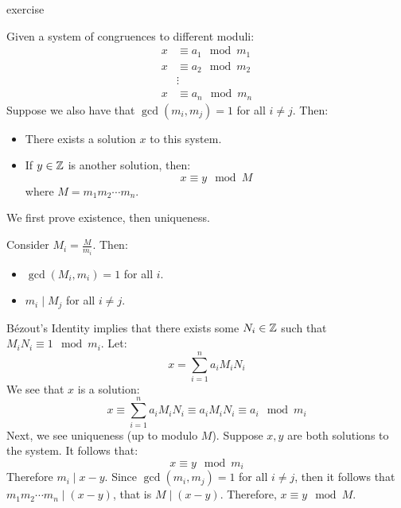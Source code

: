 \documentclass{article}
\begin{document}
\begin{pf}
    exercise
\end{pf}

\newpage
{}

\begin{thm}[title=Chinese Remainder Theorem]
    Given a system of congruences to different moduli:
    \begin{align*}
        x & \equiv a_{1} \mod m_{1} \\
        x & \equiv a_{2} \mod m_{2} \\
          & \vdots \\
        x & \equiv a_{n} \mod m_{n}
    \end{align*}
    Suppose we also have that $ \gcd(m_{i}, m_{j}) = 1 $ for all $ i \neq j $. Then:
    \begin{itemize}
        \item There exists a solution $ x $ to this system.
        \item If $ y \in \mathbb{Z} $ is another solution, then:
            \begin{equation*}
                x \equiv y \mod M
            \end{equation*}
            where $ M = m_{1}m_{2}\cdots m_{n} $.
    \end{itemize}
\end{thm}

\begin{pf}[source=Primary Source Material]
    We first prove existence, then uniqueness. \npgh

    Consider $ M_{i} = \frac{M}{m_{i}} $. Then:
    \begin{itemize}
        \item $ \gcd(M_{i}, m_{i}) = 1 $ for all $ i $.
        \item $ m_{i} \mid M_{j} $ for all $ i \neq j $.
    \end{itemize}
    B\'ezout's Identity implies that there exists some $ N_{i} \in \mathbb{Z} $ such that
    $ M_{i}N_{i} \equiv 1 \mod m_{i} $. Let:
    \begin{equation*}
        x = \sum_{i=1}^{n} {a_{i}M_{i}N_{i}}
    \end{equation*}
    We see that $ x $ is a solution:
    \begin{equation*}
        x \equiv \sum_{i=1}^{n} {a_{i}M_{i}N_{i}} \equiv a_{i}M_{i}N_{i} \equiv a_{i} \mod m_{i}
    \end{equation*} \vsp
    Next, we see uniqueness (up to modulo $ M $).
    Suppose $ x, y $ are both solutions to the system. It follows that:
    \begin{equation*}
        x \equiv y \mod m_{i}
    \end{equation*}
    Therefore $ m_{i} \mid x - y $. Since $ \gcd(m_{i}, m_{j}) = 1 $ for all $ i \neq j $, then it
    follows that $ m_{1}m_{2}\cdots m_{n} \mid (x - y) $, that is $ M \mid (x - y) $.
    Therefore, $ x \equiv y \mod M $.
\end{pf}
\end{document}
